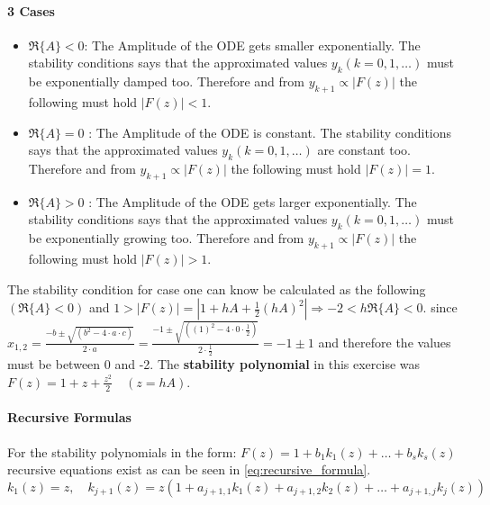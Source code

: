 \paragraph{3 Cases}
\begin{itemize}
    \item $\Re\{A\}<0$: The Amplitude of the ODE gets smaller exponentially. The stability conditions says that the approximated values $y_{k}(k=0,1, \ldots)$ must be exponentially damped too. Therefore and from $y_{k+1} \propto|F(z)|$ the following must hold $|F(z)|<1$.
    \item $\Re\{A\}=0$ : The Amplitude of the ODE is constant. The stability conditions says that the approximated values $y_{k}(k=0,1, \ldots)$ are constant too. Therefore and from $y_{k+1} \propto|F(z)|$ the following must hold $|F(z)|=1$.
    \item $\Re\{A\}>0$ : The Amplitude of the ODE gets larger exponentially. The stability conditions says that the approximated values $y_{k}(k=0,1, \ldots)$ must be exponentially growing too. Therefore and from $y_{k+1} \propto|F(z)|$ the following must hold $|F(z)|>1$.
\end{itemize}
The stability condition for case one can know be calculated as the following $(\Re\{A\}<0)$ and $1>|F(z)|=\left|1+h A+\frac{1}{2}(h A)^{2}\right| \Rightarrow-2<h \Re\{A\}<0$.  since $x_{1,2}=\frac{-b \pm \sqrt{(b^2-4\cdot a \cdot c)}}{2 \cdot a}=\frac{-1 \pm \sqrt{((1)^2-4\cdot 0 \cdot \frac{1}{2})}}{2 \cdot \frac{1}{2}}=-1 \pm 1$ and therefore the values must be between 0 and -2. The \textbf{stability polynomial} in this exercise was $F(z)=1+z+\frac{z^2}{2} \quad(z=h A)$.
\paragraph{Recursive Formulas}\mbox{}\newline
For the stability polynomials in the form: $F(z)=1+b_{1} k_{1}(z)+\ldots+b_{s} k_{s}(z)$ recursive equations exist as can be seen in \autoref{eq:recursive_formula}.
\begin{equation}\label{eq:recursive_formula}
 k_{1}(z)=z, \quad k_{j+1}(z)=z\left(1+a_{j+1,1} k_{1}(z)+a_{j+1,2} k_{2}(z)+\ldots+a_{j+1, j} k_{j}(z)\right)
\end{equation}
